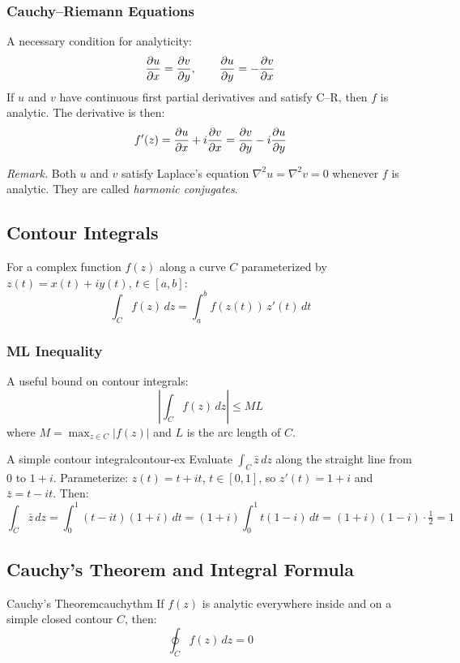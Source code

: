 \documentclass[11pt, letterpaper]{article}
\theoremstyle{plain}
\newenvironment{remark}{\smallskip\noindent\textit{Remark.}}{\smallskip}
\begin{document}
\subsubsection*{Cauchy--Riemann Equations}
A necessary condition for analyticity:
\[
    \pdv{u}{x} = \pdv{v}{y}, \qquad \pdv{u}{y} = -\pdv{v}{x}
\]
If $u$ and $v$ have continuous first partial derivatives and satisfy C--R,
then $f$ is analytic. The derivative is then:
\[
    f'(z) = \pdv{u}{x} + i\pdv{v}{x} = \pdv{v}{y} - i\pdv{u}{y}
\]

\begin{remark}
    Both $u$ and $v$ satisfy Laplace's equation $\nabla^2 u = \nabla^2 v = 0$
    whenever $f$ is analytic. They are called \emph{harmonic conjugates}.
\end{remark}


\subsection{Contour Integrals}

For a complex function $f(z)$ along a curve $C$ parameterized by
$z(t) = x(t) + iy(t)$, $t \in [a,b]$:
\[
    \int_C f(z)\,dz = \int_a^b f(z(t))\,z'(t)\,dt
\]

\subsubsection*{ML Inequality}
A useful bound on contour integrals:
\[
    \left|\int_C f(z)\,dz\right| \leq ML
\]
where $M = \max_{z\in C}|f(z)|$ and $L$ is the arc length of $C$.

\begin{example}{A simple contour integral}{contour-ex}
    Evaluate $\int_C \bar{z}\,dz$ along the straight line from $0$ to $1+i$.
    Parameterize: $z(t) = t + it$, $t\in[0,1]$, so $z'(t) = 1+i$ and
    $\bar{z} = t - it$. Then:
    \[
        \int_C \bar{z}\,dz = \int_0^1 (t-it)(1+i)\,dt
        = (1+i)\int_0^1 t(1-i)\,dt = (1+i)(1-i)\cdot\tfrac{1}{2} = 1
    \]
\end{example}


\subsection{Cauchy's Theorem and Integral Formula}

\begin{theorem}{Cauchy's Theorem}{cauchythm}
    If $f(z)$ is analytic everywhere inside and on a simple closed contour $C$,
    then:
    \[
        \oint_C f(z)\,dz = 0
    \]
\end{theorem}
\end{document}
